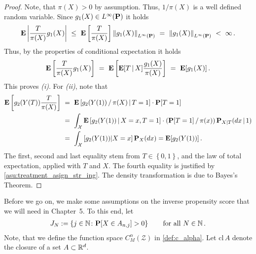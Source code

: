  \begin{proof}
   Note, that $\pi(X)>0$ by assumption. Thus, $1/\pi(X)$ is a well defined random variable.
Since $g_1(X)\in L^\infty(\P)$
it holds
\begin{align*}
    \E
    \left|
    \frac{T}{\pi(X)}
    g_1(X)
    \right|
    \ 
    \le
    \ 
    \E
    \left[
    \frac{T}{\pi(X)}
    \right]
    \norm{
    g_1(X)
  }_{L^\infty(\P)}
    \ 
  =
    \ 
    \norm{
    g_1(X)
  }_{L^\infty(\P)}
    \ 
  <
    \ 
  \infty
  \,.
\end{align*}
Thus, by the properties of conditional expectation it holds
\begin{align*}
    \E
    \left[
    \frac{T}{\pi(X)}
    g_1(X)
    \right]
    \ 
    =
    \ 
    \E
    \left[
      \E[T\,|\,X]
    \frac{g_1(X)}{\pi(X)}
    \right]
    \ 
    =
    \ 
    \E[g_1(X)]
    \,.
\end{align*}
This proves \textit{(i)}.
For \textit{(ii)}, note that
\begin{align}
  \begin{split}
    \E
    \left[ 
g_2(Y(T))
      \frac{T}{\pi(X)}
    \right]
  &\ =\ 
  \E
  \left[ 
g_2(Y(1))
    \,
    /
    \,
    \pi(X)
    \,
    \vert
    \,
    T=1
  \right]
  \cdot
  \P[T=1]
  \\
  &\ =\ 
  \int_\mathcal{X}
  \E
  \left[ 
g_2(Y(1))
    \,
    \vert
    \,
    X=x
    ,
    T=1
  \right]
  \cdot
  (
  \P[T=1]
  \,
  /
  \,
  \pi(x)
  )
  \,
  \P_{X|T}(dx\,|\,1)
  \\
  &\ =\ 
  \int_\mathcal{X}
  \left[ 
g_2(Y(1))
    \vert
    X=x
  \right]
  \P_X(dx)
  =
  \E[
g_2(Y(1))
  ]
\,.
\end{split}
\end{align}
The first, second and last equality stem from 
$
  T\in \left\{ 0,1 \right\}
$,
and the law of total expectation, applied with $T$ and $X$.
The fourth equality is justified by 
\eqref{asu:treatment_asign_str_ing}.
The density transformation is due to Bayes's Theorem.
 \end{proof}
 Before we go on, we make some assumptions on the inverse propensity score that we will need in Chapter~5.
 To this end, let 
 \begin{align*}
   J_N
   :=
   \left\{ j\in\mathbb{N}\colon
     \P[X\in A_{n,j}]>0
   \right\}
   \qquad
   \text{for all}\ 
   N\in \mathbb{N}
   \,.
 \end{align*}
 Note, that we define the function space $C^\alpha_M(\mathcal{Z})$ in
\eqref{def:c_alpha}.
Let $\mathrm{cl}\, A$ denote the closure of a set $A\subset \R^d$.
